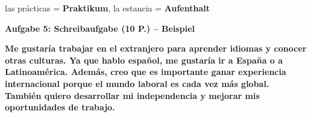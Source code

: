 \documentclass[11pt,a4paper]{article}
\newcommand{\lsg}[1]{\textcolor{loesung}{\textbf{#1}}}
\begin{document}
\begin{gruppeBbox}
las prácticas = \lsg{Praktikum}, la estancia = \lsg{Aufenthalt}

\vspace{0.5em}

\textbf{Aufgabe 5: Schreibaufgabe (10 P.) -- Beispiel}

\lsg{Me gustaría trabajar en el extranjero para aprender idiomas y conocer otras culturas. Ya que hablo español, me gustaría ir a España o a Latinoamérica. Además, creo que es importante ganar experiencia internacional porque el mundo laboral es cada vez más global. También quiero desarrollar mi independencia y mejorar mis oportunidades de trabajo.}

\end{gruppeBbox}
\end{document}
